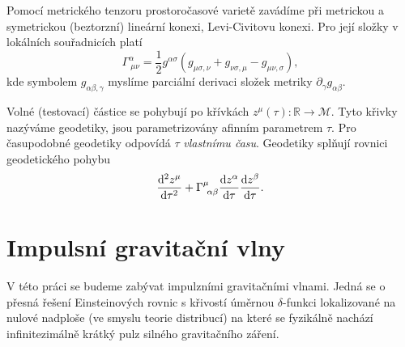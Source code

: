Pomocí metrického tenzoru prostoročasové varietě zavádíme při metrickou a symetrickou (beztorzní) lineární konexi, Levi-Civitovu konexi. Pro její složky v lokálních souřadnicích platí
\begin{equation}
    \Gamma^\alpha_{~\mu \nu} = \frac{1}{2} g^{\alpha \sigma} \left( g_{\mu \sigma,\nu} + g_{\nu \sigma, \mu} - g_{\mu \nu, \sigma}\right),
\end{equation}
kde symbolem $g_{\alpha \beta, \gamma}$ myslíme parciální derivaci složek metriky $\partial_\gamma g_{\alpha \beta}$.

Volné (testovací) částice se pohybují po křívkách $z^\mu(\tau): \mathbb{R} \to \mathcal{M}$. Tyto křivky nazýváme geodetiky, jsou parametrizovány afinním parametrem $\tau$. Pro časupodobné geodetiky
odpovídá $\tau$ \emph{vlastnímu času}. Geodetiky splňují rovnici geodetického pohybu
\begin{equation}
    \frac{\mathrm{d}^2 z^\mu}{\mathrm{d} \tau^2} + \Gamma^\mu_{~\alpha \beta} \frac{\mathrm{d} z^\alpha}{\mathrm{d} \tau} \frac{\mathrm{d} z^\beta}{\mathrm{d} \tau}.
\end{equation}


\section*{Impulsní gravitační vlny}
V této práci se budeme zabývat impulzními gravitačními vlnami. Jedná se o přesná řešení Einsteinových rovnic s křivostí úměrnou $\delta$-funkci lokalizované
na nulové nadploše (ve smyslu teorie distribucí) na které se fyzikálně nachází infinitezimálně krátký pulz silného gravitačního záření.



\clearpage
